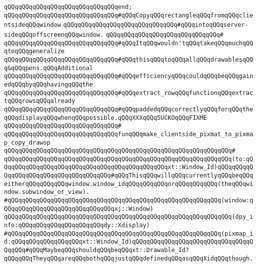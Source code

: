 \verb|qQQqqQQqqQQqqQQqqQQqqQQqqQQqqQQqend;|\newline
\newline
\verb|qQQqqQQqqQQqqQQqqQQqqQQqqQQqqQQq#qQQqCopyqQQqrectangleqQQqfromqQQqclientsideqQQqwindow|\newline
\verb|qQQqqQQqqQQqqQQqqQQqqQQqqQQqqQQq#qQQqintoqQQqserver-sideqQQqoffscreenqQQqwindow.|\newline
\verb|qQQqqQQqqQQqqQQqqQQqqQQqqQQqqQQq#|\newline
\verb|qQQqqQQqqQQqqQQqqQQqqQQqqQQqqQQq#qQQqItqQQqwouldn'tqQQqtakeqQQqmuchqQQqtoqQQqgeneralize|\newline
\verb|qQQqqQQqqQQqqQQqqQQqqQQqqQQqqQQq#qQQqthisqQQqtoqQQqallqQQqdrawablesqQQq&qQQqpens.qQQqAdditional|\newline
\verb|qQQqqQQqqQQqqQQqqQQqqQQqqQQqqQQq#qQQqefficiencyqQQqcouldqQQqbeqQQqgainedqQQqbyqQQqhavingqQQqthe|\newline
\verb|qQQqqQQqqQQqqQQqqQQqqQQqqQQqqQQq#qQQqextract_rowqQQqfunctionqQQqextractqQQqrowsqQQqalready|\newline
\verb|qQQqqQQqqQQqqQQqqQQqqQQqqQQqqQQq#qQQqpaddedqQQqcorrectlyqQQqforqQQqtheqQQqdisplayqQQqwhenqQQqpossible.qQQqXXXqQQqSUCKOqQQqFIXME|\newline
\verb|qQQqqQQqqQQqqQQqqQQqqQQqqQQqqQQq#|\newline
\verb|qQQqqQQqqQQqqQQqqQQqqQQqqQQqqQQqfunqQQqmake_clientside_pixmat_to_pixmap_copy_drawop|\newline
\verb|qQQqqQQqqQQqqQQqqQQqqQQqqQQqqQQqqQQqqQQqqQQqqQQqqQQqqQQqqQQqqQQq#|\newline
\verb|qQQqqQQqqQQqqQQqqQQqqQQqqQQqqQQqqQQqqQQqqQQqqQQqqQQqqQQqqQQqqQQq(to:qQQqqQQqqQQqqQQqqQQqqQQqqQQqqQQqqQQqqQQqqQQqqQQqxt::Window_Id)qQQqqQQqqQQqqQQqqQQqqQQqqQQqqQQqqQQqqQQq#qQQqThisqQQqwillqQQqcurrentlyqQQqbeqQQqeitherqQQqqQQqqQQqwindow.window_idqQQqqQQqqQQqorqQQqqQQqqQQq(theqQQqwindow.subwindow_or_view).|\newline
\verb|#qQQqqQQqqQQqqQQqqQQqqQQqqQQqqQQqqQQqqQQqqQQqqQQqqQQqqQQqqQQq(window:qQQqqQQqqQQqqQQqqQQqqQQqqQQqqQQqxj::Window)|\newline
\verb|qQQqqQQqqQQqqQQqqQQqqQQqqQQqqQQqqQQqqQQqqQQqqQQqqQQqqQQqqQQqqQQq(dpy_info:qQQqqQQqqQQqqQQqqQQqqQQqdy::Xdisplay)|\newline
\verb|#qQQqqQQqqQQqqQQqqQQqqQQqqQQqqQQqqQQqqQQqqQQqqQQqqQQqqQQqqQQq(pixmap_id:qQQqqQQqqQQqqQQqqQQqxt::Window_Id)qQQqqQQqqQQqqQQqqQQqqQQqqQQqqQQqqQQqqQQq#qQQqMaybeqQQqshouldqQQqbeqQQqxt::Drawable_Id?qQQqqQQqTheyqQQqareqQQqbothqQQqjustqQQqdefinedqQQqasqQQqXidqQQqthough.|\newline
